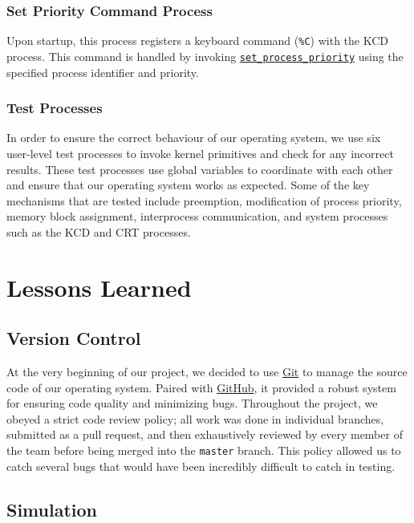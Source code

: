 \documentclass[12pt]{report}
\begin{document}
\subsection{Set Priority Command Process}

Upon startup, this process registers a keyboard command (\texttt{\%C}) with the KCD process. This command is handled by invoking \hyperref[alg:processpriority]{\texttt{set_process_priority}} using the specified process identifier and priority.

\subsection{Test Processes}

In order to ensure the correct behaviour of our operating system, we use six user-­level test processes to invoke kernel primitives and check for any incorrect results. These test processes use global variables to coordinate with each other and ensure that  our operating system works as expected. Some of the key mechanisms that are tested include preemption, modification of process priority, memory block assignment, interprocess communication, and system processes such as the KCD and CRT processes.

\chapter{Lessons Learned}

\section{Version Control}

At the very beginning of our project, we decided to use \href{http://git-scm.com/}{Git} to manage the source code of our operating system. Paired with \href{http://github.com/}{GitHub}, it provided a robust system for ensuring code quality and minimizing bugs. Throughout the project, we obeyed a strict code review policy; all work was done in individual branches, submitted as a pull request, and then exhaustively reviewed by every member of the team before being merged into the \texttt{master} branch. This policy allowed us to catch several bugs that would have been incredibly difficult to catch in testing.

\section{Simulation}
\end{document}

